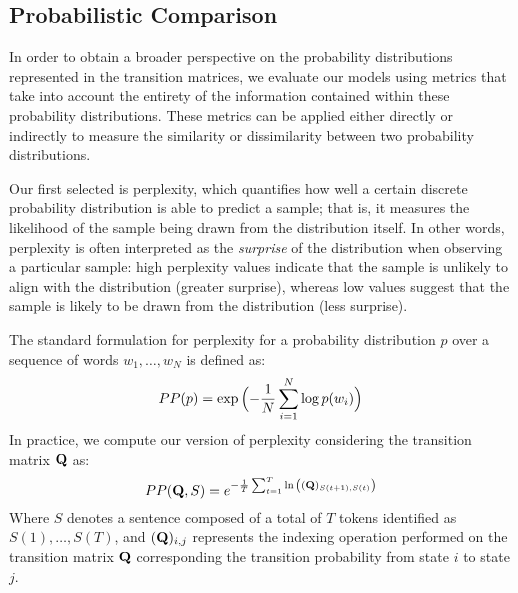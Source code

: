 \subsection{Probabilistic Comparison}\label{ssec:method_fom_prob}

In order to obtain a broader perspective on the probability distributions represented in the transition matrices, we evaluate our models using metrics that take into account the entirety of the information contained within these probability distributions.
These metrics can be applied either directly or indirectly to measure the similarity or dissimilarity between two probability distributions.

Our first selected is perplexity, which quantifies how well a certain discrete probability distribution is able to predict a sample; that is, it measures the likelihood of the sample being drawn from the distribution itself.
In other words, perplexity is often interpreted as the \emph{surprise} of the distribution when observing a particular sample: high perplexity values indicate that the sample is unlikely to align with the distribution (greater surprise), whereas low values suggest that the sample is likely to be drawn from the distribution (less surprise).

The standard formulation for perplexity for a probability distribution $p$ over a sequence of words $w_1,\dots,w_N$ is defined as:
\begin{equation}
    \label{eq:method_fom_perplexity-base}
    PP(p) = \exp{\Bigl(-\frac{1}{N}\sum_{i=1}^{N}{\log{p(w_i)}}\Bigr)}
\end{equation}
In practice, we compute our version of perplexity considering the transition matrix $\bm{\mathbf{Q}}$ as:
\begin{equation}
    \label{eq:method_fom_perplexity}
    PP(\bm{\mathbf{Q}}, S) = e^{-\frac{1}{T}\sum_{t=1}^{T}{\ln{\left((\bm{\mathbf{Q}})_{S(t+1),S(t)}\right)}}}
\end{equation}
Where $S$ denotes a sentence composed of a total of $T$ tokens identified as $S(1),\dots,S(T)$, and $(\bm{\mathbf{Q}})_{i,j}$ represents the indexing operation performed on the transition matrix $\bm{\mathbf{Q}}$ corresponding the transition probability from state $i$ to state $j$.

